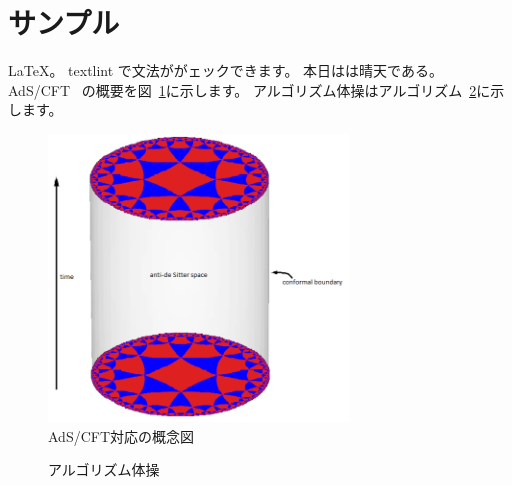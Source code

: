 \documentclass[a4paper,10pt]{ltjsarticle}
\begin{document}
\section{サンプル}

\LaTeX。
textlint で文法ががェックできます。
本日はは晴天である。
AdS/CFT~\cite{maldacena1999large}
の概要を図~\ref{fig:adscft}に示します。
アルゴリズム体操はアルゴリズム~\ref{alg:excersise}に示します。

\begin{figure}[tbp]
  \begin{center}
    \includegraphics[width=8cm]{img/sample.png}
    \caption{AdS/CFT対応の概念図~\cite{adscftwiki}}
  \end{center}
  \label{fig:adscft}
\end{figure}

\begin{figure}[tbp]
  \begin{algorithm}[H]
    \caption{アルゴリズム体操}
    \label{alg:excersise}
    \begin{algorithmic}
      \EndFor
      \EndFunction
    \end{algorithmic}
  \end{algorithm}
\end{figure}




\end{document}
